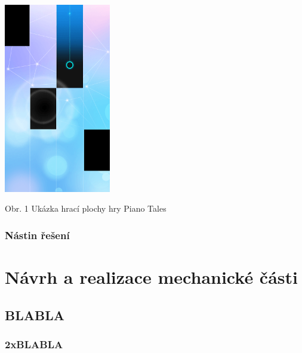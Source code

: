 \documentclass[12pt,oneside]{book} %
\begin{document}
\begin{center} \large\label{pianotales}
\includegraphics[width=0.35\textwidth]{./img/pianotales.png}\\[1cm] 	
\end{center}   
      
\begin{center}
Obr. 1 Ukázka hrací plochy hry Piano Tales
\end{center}
\section{Nástin řešení}\label{nastin}

\part{Návrh a realizace mechanické části}\label{mechanika}

\chapter{BLABLA}\label{BLABLA}
\section{2xBLABLA}\label{2xBLABLA}
\end{document}
